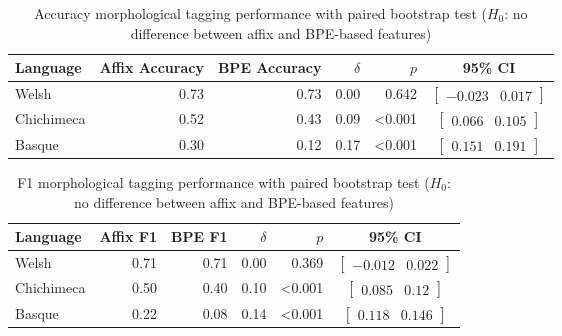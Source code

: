 \documentclass{article}
\begin{document}
\begin{table*}
\centering
\begin{tabular}{lrrrrc}
\textbf{Language} & \textbf{Affix Accuracy} & \textbf{BPE Accuracy} & $\delta$ & $p$ & \textbf{95\% CI}\\
\hline
Welsh & 0.73 & 0.73 & 0.00 & 0.642 & $\begin{bmatrix}-0.023 & 0.017\end{bmatrix}$ \\
Chichimeca & 0.52 & 0.43 & 0.09 & <0.001 & $\begin{bmatrix}0.066 & 0.105\end{bmatrix}$ \\
Basque & 0.30 & 0.12 & 0.17 & <0.001 & $\begin{bmatrix}0.151 & 0.191\end{bmatrix}$ \\
\end{tabular}
\caption{Accuracy morphological tagging performance with paired bootstrap test ($H_0$: no difference between affix and BPE-based features)}
\label{tab:feat-accuracy}
\end{table*}

\begin{table*}
\centering
\begin{tabular}{lrrrrc}
\textbf{Language} & \textbf{Affix F1} & \textbf{BPE F1} & $\delta$ & $p$ & \textbf{95\% CI}\\
\hline
Welsh & 0.71 & 0.71 & 0.00 & 0.369 & $\begin{bmatrix}-0.012 & 0.022\end{bmatrix}$ \\
Chichimeca & 0.50 & 0.40 & 0.10 & <0.001 & $\begin{bmatrix}0.085 & 0.12\end{bmatrix}$ \\
Basque & 0.22 & 0.08 & 0.14 & <0.001 & $\begin{bmatrix}0.118 & 0.146\end{bmatrix}$ \\
\end{tabular}
\caption{F1 morphological tagging performance with paired bootstrap test ($H_0$: no difference between affix and BPE-based features)}
\label{tab:feat-f1}
\end{table*}
\end{document}
